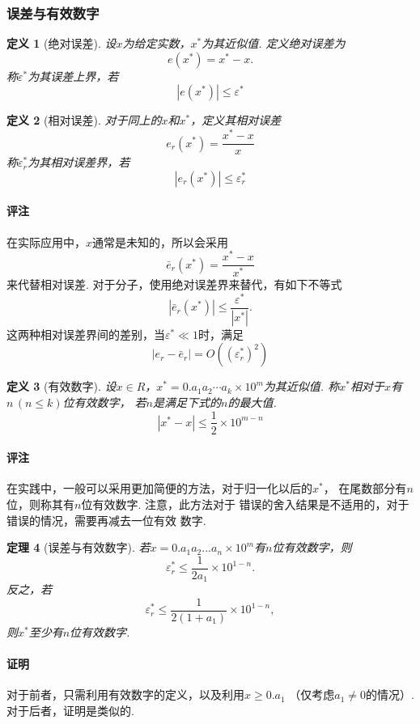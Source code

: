\documentclass[12pt, a4paper]{article}
\theoremstyle{margin}
\newtheorem{thm}{定理}
\newtheorem{defi}[thm]{定义}
\newcommand{\vep}{\varepsilon}
\newcommand{\aoneton}{a_1a_2\dots a_n}
\newcommand{\remark}{\paragraph{评注}}
\newcommand{\proof}{\paragraph{证明}}
\begin{document}
\subsubsection{误差与有效数字}
  \begin{defi}[绝对误差]
    设$x$为给定实数，$x^*$为其近似值. 定义绝对误差为
    \[
      e(x^*) = x^* - x.
    \]
    称$\varepsilon^*$为其误差上界，若
    \[
      |e(x^*)| \le \varepsilon^*
    \]
  \end{defi}

  \begin{defi}[相对误差]
    对于同上的$x$和$x^*$，定义其相对误差
    \[
      e_r(x^*)=\frac{x^* - x}{x}
    \]
    称$\varepsilon_r^*$为其相对误差界，若
    \[
      |e_r(x^*)|\le\varepsilon_r^*
    \]
  \end{defi}
  \remark
    在实际应用中，$x$通常是未知的，所以会采用
    \[
      \bar{e}_r(x^*)=\frac{x^*-x}{x^*}
    \]
    来代替相对误差. 对于分子，使用绝对误差界来替代，有如下不等式
    \[
      |\bar{e}_r(x^*)| \le \frac{\varepsilon^*}{|x^*|}.
    \]
    这两种相对误差界间的差别，当$\varepsilon^*\ll 1$时，满足
    \[
      |e_r-\bar{e}_r|=O((\varepsilon_r^*)^2)
    \]

  \begin{defi}[有效数字]
    设$x\in R$，$x^*=0.a_1a_2\cdots a_k\times 10^m$为其近似值.
    称$x^*$相对于$x$有$n\,(n\le k)$位有效数字，
    若$n$是满足下式的$n$的最大值.
    \[
      |x^* - x| \le \frac{1}{2} \times 10^{m - n}
    \]
  \end{defi}
  \remark
    在实践中，一般可以采用更加简便的方法，对于归一化以后的$x^*$，
    在尾数部分有$n$位，则称其有$n$位有效数字. 注意，此方法对于
    错误的舍入结果是不适用的，对于错误的情况，需要再减去一位有效
    数字.

  \begin{thm}[误差与有效数字]
    若$x=0.\aoneton\times10^m$有$n$位有效数字，则
    \[
      \vep^*_r \le
      \frac{1}{2a_1}\times10^{1-n}.
    \]
    反之，若
    \[
      \vep^*_r \le
      \frac{1}{2(1+a_1)}\times 10^{1-n},
    \]
    则$x^*$至少有$n$位有效数字.
  \end{thm}
  \proof
    对于前者，只需利用有效数字的定义，以及利用$x\ge 0.a_1$
    （仅考虑$a_1\ne0$的情况）. 对于后者，证明是类似的.
\end{document}
